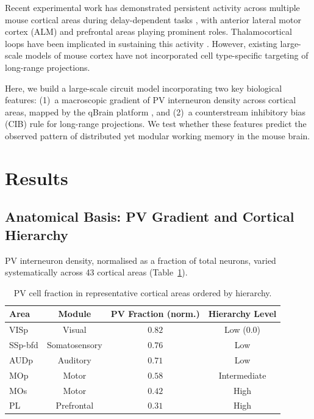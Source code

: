 \documentclass[11pt]{article}
\begin{document}
Recent experimental work has demonstrated persistent activity across multiple mouse cortical areas during delay-dependent tasks \citep{li2020robust, guo2014flow, inagaki2019discrete}, with anterior lateral motor cortex (ALM) and prefrontal areas playing prominent roles. Thalamocortical loops have been implicated in sustaining this activity \citep{guo2017maintenance, schmitt2017thalamic}. However, existing large-scale models of mouse cortex \citep{oh2014mesoscale, harris2019hierarchical} have not incorporated cell type-specific targeting of long-range projections.

Here, we build a large-scale circuit model incorporating two key biological features: (1)~a macroscopic gradient of PV interneuron density across cortical areas, mapped by the qBrain platform \citep{kim2017intersectional}, and (2)~a counterstream inhibitory bias (CIB) rule for long-range projections. We test whether these features predict the observed pattern of distributed yet modular working memory in the mouse brain.

\section{Results}

\subsection{Anatomical Basis: PV Gradient and Cortical Hierarchy}

PV interneuron density, normalised as a fraction of total neurons, varied systematically across 43 cortical areas (Table~\ref{tab:anatomy}).

\begin{table}[H]
\centering
\caption{PV cell fraction in representative cortical areas ordered by hierarchy.}
\label{tab:anatomy}
\begin{tabular}{@{}lccc@{}}
\toprule
Area & Module & PV Fraction (norm.) & Hierarchy Level \\
\midrule
VISp & Visual & $0.82$ & Low (0.0) \\
SSp-bfd & Somatosensory & $0.76$ & Low \\
AUDp & Auditory & $0.71$ & Low \\
MOp & Motor & $0.58$ & Intermediate \\
MOs & Motor & $0.42$ & High \\
PL & Prefrontal & $0.31$ & High \\
\bottomrule
\end{tabular}
\end{table}
\end{document}
